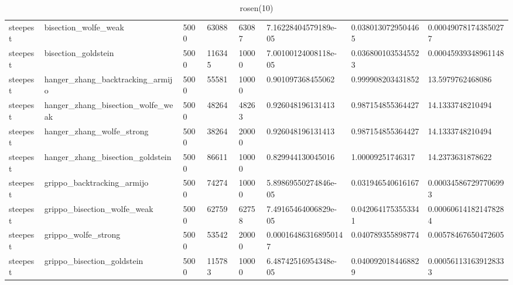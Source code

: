 \documentclass[a4paper,11pt]{article}
\numberwithin{equation}{section} %
\begin{document}
\begin{table}[h!]
{\begin{tabular}{|l|l|l|l|l|l|l|l|}
        steepest & bisection\_wolfe\_weak & 5000 & 63088 & 63087 & 7.16228404579189e-05 & 0.0380130729504465 & 0.000490781743850277 \\
        steepest & bisection\_goldstein & 5000 & 116345 & 10000 & 7.00100124008118e-05 & 0.0368001035345523 & 0.00045939348961148 \\
        steepest & hanger\_zhang\_backtracking\_armijo & 5000 & 55581 & 10000 & 0.901097368455062 & 0.999908203431852 & 13.5979762468086 \\
        steepest & hanger\_zhang\_bisection\_wolfe\_weak & 5000 & 48264 & 48263 & 0.926048196131413 & 0.987154855364427 & 14.1333748210494 \\
        steepest & hanger\_zhang\_wolfe\_strong & 5000 & 38264 & 20000 & 0.926048196131413 & 0.987154855364427 & 14.1333748210494 \\
        steepest & hanger\_zhang\_bisection\_goldstein & 5000 & 86611 & 10000 & 0.829944130045016 & 1.00009251746317 & 14.2373631878622 \\
        steepest & grippo\_backtracking\_armijo & 5000 & 74274 & 10000 & 5.89869550274846e-05 & 0.031946540616167 & 0.000345867297706993 \\
        steepest & grippo\_bisection\_wolfe\_weak & 5000 & 62759 & 62758 & 7.49165464006829e-05 & 0.0420641753553341 & 0.000606141821478284 \\
        steepest & grippo\_wolfe\_strong & 5000 & 53542 & 20000 & 0.000164863168950147 & 0.040789355898774 & 0.00578467650472605 \\
        steepest & grippo\_bisection\_goldstein & 5000 & 115783 & 10000 & 6.48742516954348e-05 & 0.0400920184468829 & 0.000561131639128333 \\

\end{tabular}}
\caption{rosen(10)}
\label{table:rosen(10)}
\end{table}
\end{document}

